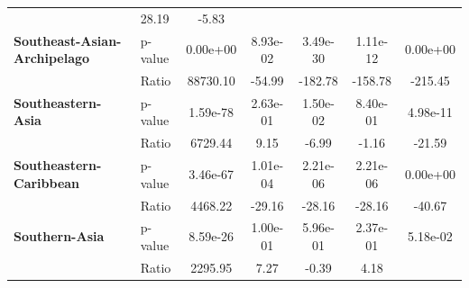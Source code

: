 \begin{table}[H]
{\begin{tabular}{llccccc}
                                                                & 28.19    &
            -5.83
            \\
            \textbf{Southeast-Asian-Archipelago}                & p-value  &
            0.00e+00                                            & 8.93e-02 &
            3.49e-30                                            & 1.11e-12 &
            0.00e+00
            \\
            \textbf{}                                           & Ratio    &
            88730.10                                            & -54.99   &
            -182.78
                                                                & -158.78  &
            -215.45
            \\
            \textbf{Southeastern-Asia}                          & p-value  &
            1.59e-78                                            & 2.63e-01 &
            1.50e-02                                            & 8.40e-01 &
            4.98e-11
            \\
            \textbf{}                                           & Ratio    &
            6729.44                                             & 9.15     &
            -6.99
                                                                & -1.16    &
            -21.59
            \\
            \textbf{Southeastern-Caribbean}                     & p-value  &
            3.46e-67                                            & 1.01e-04 &
            2.21e-06                                            & 2.21e-06 &
            0.00e+00
            \\
            \textbf{}                                           & Ratio    &
            4468.22                                             & -29.16   &
            -28.16
                                                                & -28.16   &
            -40.67
            \\
            \textbf{Southern-Asia}                              & p-value  &
            8.59e-26                                            & 1.00e-01 &
            5.96e-01                                            & 2.37e-01 &
            5.18e-02
            \\
            \textbf{}                                           & Ratio    &
            2295.95                                             & 7.27     &
            -0.39
                                                                & 4.18     &

\end{tabular}}
\end{table}
